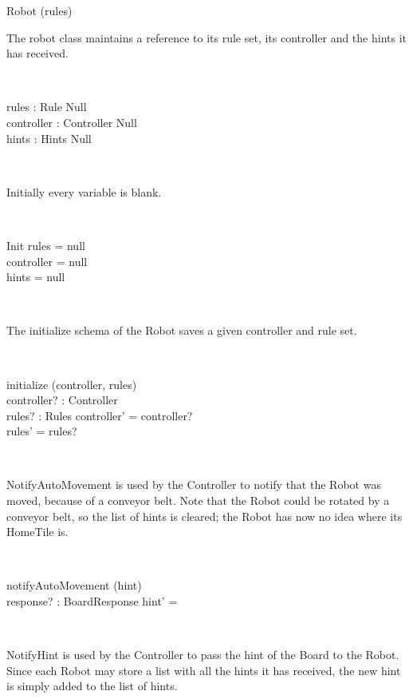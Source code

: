 \begin{class}{Robot}
\upharpoonright (rules) \\
\begin{zpar}
The robot class maintains a reference to its rule set, its controller and the hints it has received.
\end{zpar} \\
\begin{state}
rules : Rule \cup Null \\
controller : Controller \cup Null \\
hints : \power Hints \cup Null
\end{state}\\
\begin{zpar}
Initially every variable is blank.
\end{zpar} \\
\begin{schema}{Init}
rules = null \\
controller = null \\
hints = null
\end{schema} \\
\begin{zpar}
The initialize schema of the Robot saves a given controller and rule set.
\end{zpar} \\
\begin{schema}{initialize}
\Delta (controller, rules) \\
controller? : Controller \\
rules? : Rules
\where
controller' = controller? \\
rules' = rules?
\end{schema} \\
\begin{zpar}
NotifyAutoMovement is used by the Controller to notify that the Robot was moved, because of a conveyor belt. Note that the Robot could be rotated by a conveyor belt, so the list of hints is cleared; the Robot has now no idea where its HomeTile is.
\end{zpar} \\
\begin{schema}{notifyAutoMovement}
\Delta (hint) \\
response? : BoardResponse
\where
hint' = \emptyset
\end{schema}\\
\begin{zpar}
NotifyHint is used by the Controller to pass the hint of the Board to the Robot. Since each Robot may store a list with all the hints it has received, the new hint is simply added to the list of hints.

\end{zpar}
\end{class}
